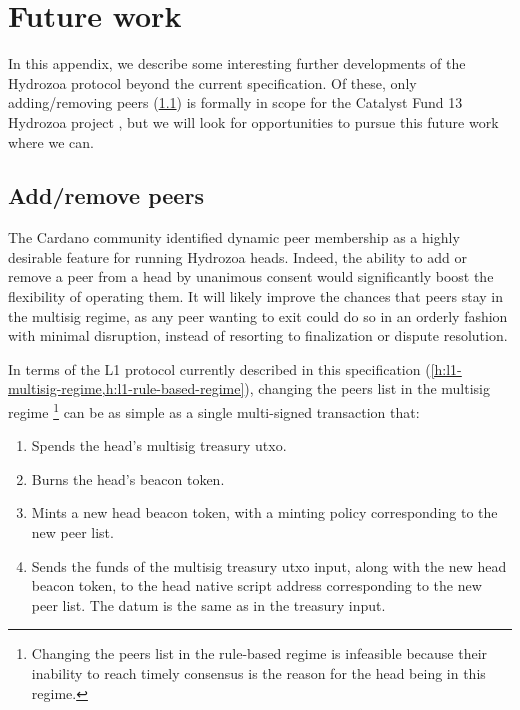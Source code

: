 \documentclass[../hydrozoa.tex]{subfiles}
\begin{document}
\setcounter{footnote}{0}%
\chapter{Future work}%
\label{h:future-work}%

In this appendix, we describe some interesting further developments of the Hydrozoa protocol beyond the current specification.
Of these, only adding/removing peers (\cref{h:future-work-add-remove-members}) is formally in scope for the Catalyst Fund 13 Hydrozoa project \citep{FlerovskyCatalystMilestonesHydrozoa2024}, but we will look for opportunities to pursue this future work where we can.

\section{Add/remove peers}%
\label{h:future-work-add-remove-members}%

The Cardano community identified dynamic peer membership as a highly desirable feature for running Hydrozoa heads.
Indeed, the ability to add or remove a peer from a head by unanimous consent would significantly boost the flexibility of operating them.
It will likely improve the chances that peers stay in the multisig regime, as any peer wanting to exit could do so in an orderly fashion with minimal disruption, instead of resorting to finalization or dispute resolution.

In terms of the L1 protocol currently described in this specification (\cref{h:l1-multisig-regime,h:l1-rule-based-regime}), changing the peers list in the multisig regime%
  \footnote{Changing the peers list in the rule-based regime is infeasible because their inability to reach timely consensus is the reason for the head being in this regime.}
  can be as simple as a single multi-signed transaction that:
\begin{enumerate}
  \item Spends the head's multisig treasury utxo.  
  \item Burns the head's beacon token.
  \item Mints a new head beacon token, with a minting policy corresponding to the new peer list.
  \item Sends the funds of the multisig treasury utxo input, along with the new head beacon token, to the head native script address corresponding to the new peer list.
    The datum is the same as in the treasury input.
\end{enumerate}
\end{document}
